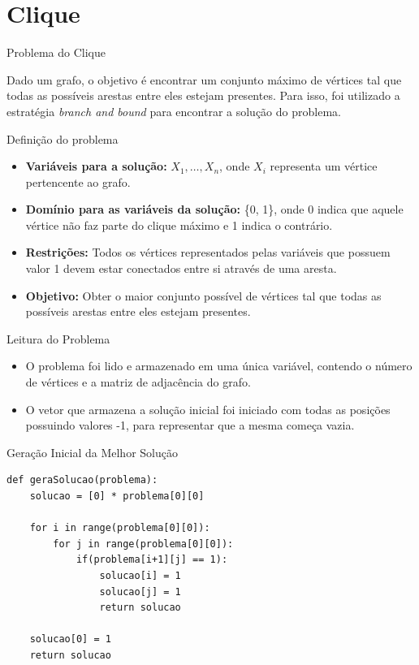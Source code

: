 \documentclass[compress,aspectratio=169]{beamer}
\subtitle[PAA]  {Clique, Conjunto Independente e SAT}
\begin{document}
\begindocument

\section{Clique}
    \begin{frame}{Problema do Clique}
        \begin{justify}
            Dado um grafo, o objetivo é encontrar um conjunto máximo de vértices tal que todas as possíveis arestas entre eles estejam presentes. Para isso, foi utilizado a estratégia \textit{branch and bound} para encontrar a solução do problema.
        \end{justify}
    \end{frame}
    
    \begin{frame}{Definição do problema}
        \begin{itemize}
            \item \textbf{Variáveis para a solução:} \(X_1, \dots, X_n\), onde \(X_i\) representa um vértice pertencente ao grafo.
            \item \textbf{Domínio para as variáveis da solução:} \{0, 1\}, onde 0 indica que aquele vértice não faz parte do clique máximo e 1 indica o contrário.
            \item \textbf{Restrições:} Todos os vértices representados pelas variáveis que possuem valor 1 devem estar conectados entre si através de uma aresta.
            \item \textbf{Objetivo:} Obter o maior conjunto possível de vértices tal que todas as possíveis arestas entre eles estejam presentes.
        \end{itemize}
    \end{frame}

    \begin{frame}{Leitura do Problema}
        \begin{itemize}
            \item O problema foi lido e armazenado em uma única variável, contendo o número de vértices e a matriz de adjacência do grafo.
            \item O vetor que armazena a solução inicial foi iniciado com todas as posições possuindo valores -1, para representar que a mesma começa vazia.
        \end{itemize}
    \end{frame}

    \begin{frame}[fragile]{Geração Inicial da Melhor Solução}
        \begin{lstlisting}
def geraSolucao(problema):
    solucao = [0] * problema[0][0]

    for i in range(problema[0][0]):
        for j in range(problema[0][0]):
            if(problema[i+1][j] == 1):
                solucao[i] = 1
                solucao[j] = 1
                return solucao

    solucao[0] = 1
    return solucao
        \end{lstlisting}
    \end{frame}
    
\end{document}

